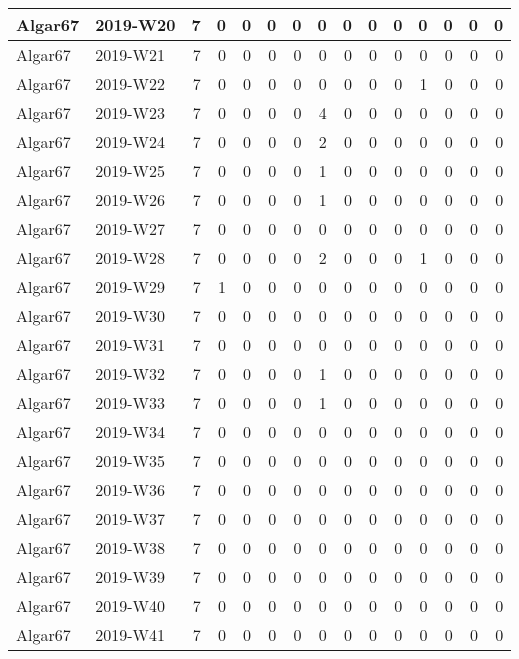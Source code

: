 \documentclass[]{book}
\begin{document}
\begin{table}
\begin{tabular}[t]{l|l|r|r|r|r|r|r|r|r|r|r|r|r|r}
\hline
Algar67 & 2019-W20 & 7 & 0 & 0 & 0 & 0 & 0 & 0 & 0 & 0 & 0 & 0 & 0 & 0\\
\hline
Algar67 & 2019-W21 & 7 & 0 & 0 & 0 & 0 & 0 & 0 & 0 & 0 & 0 & 0 & 0 & 0\\
\hline
Algar67 & 2019-W22 & 7 & 0 & 0 & 0 & 0 & 0 & 0 & 0 & 0 & 1 & 0 & 0 & 0\\
\hline
Algar67 & 2019-W23 & 7 & 0 & 0 & 0 & 0 & 4 & 0 & 0 & 0 & 0 & 0 & 0 & 0\\
\hline
Algar67 & 2019-W24 & 7 & 0 & 0 & 0 & 0 & 2 & 0 & 0 & 0 & 0 & 0 & 0 & 0\\
\hline
Algar67 & 2019-W25 & 7 & 0 & 0 & 0 & 0 & 1 & 0 & 0 & 0 & 0 & 0 & 0 & 0\\
\hline
Algar67 & 2019-W26 & 7 & 0 & 0 & 0 & 0 & 1 & 0 & 0 & 0 & 0 & 0 & 0 & 0\\
\hline
Algar67 & 2019-W27 & 7 & 0 & 0 & 0 & 0 & 0 & 0 & 0 & 0 & 0 & 0 & 0 & 0\\
\hline
Algar67 & 2019-W28 & 7 & 0 & 0 & 0 & 0 & 2 & 0 & 0 & 0 & 1 & 0 & 0 & 0\\
\hline
Algar67 & 2019-W29 & 7 & 1 & 0 & 0 & 0 & 0 & 0 & 0 & 0 & 0 & 0 & 0 & 0\\
\hline
Algar67 & 2019-W30 & 7 & 0 & 0 & 0 & 0 & 0 & 0 & 0 & 0 & 0 & 0 & 0 & 0\\
\hline
Algar67 & 2019-W31 & 7 & 0 & 0 & 0 & 0 & 0 & 0 & 0 & 0 & 0 & 0 & 0 & 0\\
\hline
Algar67 & 2019-W32 & 7 & 0 & 0 & 0 & 0 & 1 & 0 & 0 & 0 & 0 & 0 & 0 & 0\\
\hline
Algar67 & 2019-W33 & 7 & 0 & 0 & 0 & 0 & 1 & 0 & 0 & 0 & 0 & 0 & 0 & 0\\
\hline
Algar67 & 2019-W34 & 7 & 0 & 0 & 0 & 0 & 0 & 0 & 0 & 0 & 0 & 0 & 0 & 0\\
\hline
Algar67 & 2019-W35 & 7 & 0 & 0 & 0 & 0 & 0 & 0 & 0 & 0 & 0 & 0 & 0 & 0\\
\hline
Algar67 & 2019-W36 & 7 & 0 & 0 & 0 & 0 & 0 & 0 & 0 & 0 & 0 & 0 & 0 & 0\\
\hline
Algar67 & 2019-W37 & 7 & 0 & 0 & 0 & 0 & 0 & 0 & 0 & 0 & 0 & 0 & 0 & 0\\
\hline
Algar67 & 2019-W38 & 7 & 0 & 0 & 0 & 0 & 0 & 0 & 0 & 0 & 0 & 0 & 0 & 0\\
\hline
Algar67 & 2019-W39 & 7 & 0 & 0 & 0 & 0 & 0 & 0 & 0 & 0 & 0 & 0 & 0 & 0\\
\hline
Algar67 & 2019-W40 & 7 & 0 & 0 & 0 & 0 & 0 & 0 & 0 & 0 & 0 & 0 & 0 & 0\\
\hline
Algar67 & 2019-W41 & 7 & 0 & 0 & 0 & 0 & 0 & 0 & 0 & 0 & 0 & 0 & 0 & 0\\

\end{tabular}
\end{table}
\end{document}
